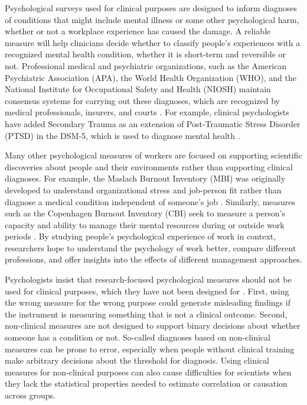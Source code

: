 Psychological surveys used for clinical purposes are designed to inform diagnoses of conditions that might include mental illness or some other psychological harm, whether or not a workplace experience has caused the damage. A reliable measure will help clinicians decide whether to classify people's experiences with a recognized mental health condition, whether it is short-term and reversible or not. Professional medical and psychiatric organizations, such as the American Psychiatric Association (APA), the World Health Organization (WHO), and the National Institute for Occupational Safety and Health (NIOSH) maintain consensus systems for carrying out these diagnoses, which are recognized by medical professionals, insurers, and courts \cite{who_icd11,apa2013,tetrick2023handbook}. For example, clinical psychologists have added Secondary Trauma as an extension of Post-Traumatic Stress Disorder (PTSD) in the DSM-5, which is used to diagnose mental health \cite{hydon2015preventing,apa2013}.

Many other psychological measures of workers are focused on supporting scientific discoveries about people and their environments rather than supporting clinical diagnoses. For example, the Maslach Burnout Inventory (MBI) was originally developed to understand organizational stress and job-person fit rather than diagnose a medical condition independent of someone's job \cite{MaslachJackson1981,kahn1992stress}. Similarly, measures such as the Copenhagen Burnout Inventory (CBI) seek to measure a person's capacity and ability to manage their mental resources during or outside work periods \cite{kristensen2005copenhagen}. By studying people's psychological experience of work in context, researchers hope to understand the psychology of work better, compare different professions, and offer insights into the effects of different management approaches.

Psychologists insist that research-focused psychological measures should not be used for clinical purposes, which they have not been designed for \cite{tetrick2023handbook}. First, using the wrong measure for the wrong purpose could generate misleading findings if the instrument is measuring something that is not a clinical outcome. Second, non-clinical measures are not designed to support binary decisions about whether someone has a condition or not. So-called diagnoses based on non-clinical measures can be prone to error, especially when people without clinical training make arbitrary decisions about the threshold for diagnosis. Using clinical measures for non-clinical purposes can also cause difficulties for scientists when they lack the statistical properties needed to estimate correlation or causation across groups.


